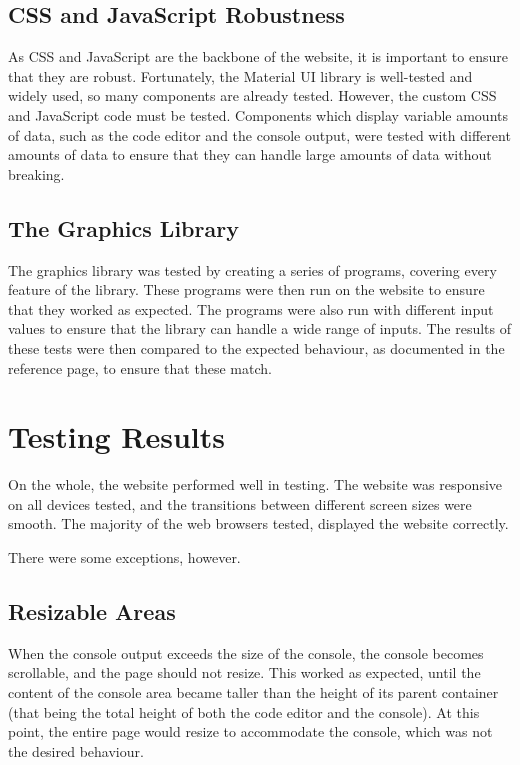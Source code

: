 \documentclass[../main.tex]{subfiles}
\begin{document}
        \subsection{CSS and JavaScript Robustness}
            As CSS and JavaScript are the backbone of the website, it is important to
                ensure that they are robust.
            Fortunately, the Material UI library is well-tested and widely used, so many
                components are already tested.
            However, the custom CSS and JavaScript code must be tested.
            Components which display variable amounts of data, such as the code editor and
                the console output, were tested with different amounts of data to ensure that
                they can handle large amounts of data without breaking.

        \subsection{The Graphics Library}
            The graphics library was tested by creating a series of programs, covering
                every feature of the library.
            These programs were then run on the website to ensure that they worked as
                expected.
            The programs were also run with different input values to ensure that the
                library can handle a wide range of inputs.
            The results of these tests were then compared to the expected behaviour, as
                documented in the reference page, to ensure that these match.

    \section{Testing Results}
        On the whole, the website performed well in testing.
        The website was responsive on all devices tested, and the transitions between
            different screen sizes were smooth.
        The majority of the web browsers tested, displayed the website correctly.

        There were some exceptions, however.

        \subsection{Resizable Areas}
            When the console output exceeds the size of the console, the console becomes
                scrollable, and the page should not resize.
            This worked as expected, until the content of the console area became taller
                than the height of its parent container (that being the total height of both
                the code editor and the console).
            At this point, the entire page would resize to accommodate the console, which
                was not the desired behaviour.
\end{document}
